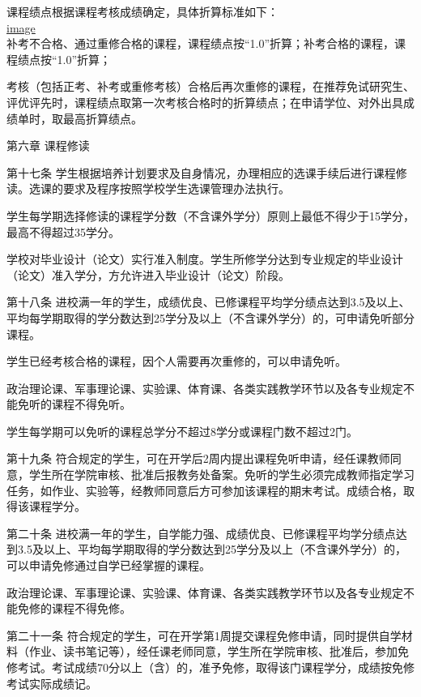 \documentclass[UTF8,12pt,a4paper]{report}
\begin{document}
课程绩点根据课程考核成绩确定，具体折算标准如下：\\

\href{http://img01.fs.yiban.cn/out/thumb_550x0/aHR0cDovL3lmczAxLmZzLnlpYmFuLmNuL3dlYi83NTg4OTE0L3VwbG9hZC8xNTA0NzY5NDc2Mzc4OTYyLnBuZw==}{image}\\

补考不合格、通过重修合格的课程，课程绩点按“1.0”折算；补考合格的课程，课程绩点按“1.0”折算；

考核（包括正考、补考或重修考核）合格后再次重修的课程，在推荐免试研究生、评优评先时，课程绩点取第一次考核合格时的折算绩点；在申请学位、对外出具成绩单时，取最高折算绩点。



第六章  课程修读

第十七条  学生根据培养计划要求及自身情况，办理相应的选课手续后进行课程修读。选课的要求及程序按照学校学生选课管理办法执行。

学生每学期选择修读的课程学分数（不含课外学分）原则上最低不得少于15学分，最高不得超过35学分。

学校对毕业设计（论文）实行准入制度。学生所修学分达到专业规定的毕业设计（论文）准入学分，方允许进入毕业设计（论文）阶段。

第十八条  进校满一年的学生，成绩优良、已修课程平均学分绩点达到3.5及以上、平均每学期取得的学分数达到25学分及以上（不含课外学分）的，可申请免听部分课程。

学生已经考核合格的课程，因个人需要再次重修的，可以申请免听。

政治理论课、军事理论课、实验课、体育课、各类实践教学环节以及各专业规定不能免听的课程不得免听。

学生每学期可以免听的课程总学分不超过8学分或课程门数不超过2门。

第十九条  符合规定的学生，可在开学后2周内提出课程免听申请，经任课教师同意，学生所在学院审核、批准后报教务处备案。免听的学生必须完成教师指定学习任务，如作业、实验等，经教师同意后方可参加该课程的期末考试。成绩合格，取得该课程学分。

第二十条  进校满一年的学生，自学能力强、成绩优良、已修课程平均学分绩点达到3.5及以上、平均每学期取得的学分数达到25学分及以上（不含课外学分）的，可以申请免修通过自学已经掌握的课程。

政治理论课、军事理论课、实验课、体育课、各类实践教学环节以及各专业规定不能免修的课程不得免修。

第二十一条  符合规定的学生，可在开学第1周提交课程免修申请，同时提供自学材料（作业、读书笔记等），经任课老师同意，学生所在学院审核、批准后，参加免修考试。考试成绩70分以上（含）的，准予免修，取得该门课程学分，成绩按免修考试实际成绩记。
\end{document}
